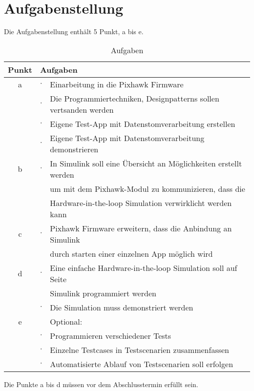 \section{Aufgabenstellung}

Die Aufgabenstellung enthält 5 Punkt, a bis e. \\

\begin{table}[ht]
\begin{tabular}{c | cl}
\hline

Punkt & \multicolumn{2}{l}{ Aufgaben}\\
\hline

a & $\cdot$ & Einarbeitung in die Pixhawk Firmware\\
  & $\cdot$ & Die Programmiertechniken, Designpatterns sollen vertsanden werden\\
  & $\cdot$ & Eigene Test-App mit Datenstomverarbeitung erstellen\\
  & $\cdot$ & Eigene Test-App mit Datenstomverarbeitung demonstrieren\\
\hline

b & $\cdot$ & In Simulink soll eine Übersicht an Möglichkeiten erstellt werden \\
  & & um mit dem Pixhawk-Modul zu kommunizieren, dass die \\
  & & Hardware-in-the-loop Simulation verwirklicht werden kann\\
\hline

c & $\cdot$ & Pixhawk Firmware erweitern, dass die Anbindung an Simulink \\
  & & durch starten einer einzelnen App möglich wird\\
\hline

d & $\cdot$ & Eine einfache Hardware-in-the-loop Simulation soll auf Seite \\
  & & Simulink programmiert werden\\
  & $\cdot$ & Die Simulation muss demonstriert werden\\
\hline

e & & Optional:\\
  & $\cdot$ & Programmieren verschiedener Tests\\
  & $\cdot$ & Einzelne Testcases in Testscenarien zusammenfassen\\
  & $\cdot$ & Automatisierte Ablauf von Testscenarien soll erfolgen\\
\hline
\end{tabular}

\label{tab:aufgaben}
\caption{Aufgaben}
\end{table}


\medskip

\noindent Die Punkte a bis d müssen vor dem Abschlusstermin erfüllt sein.\\


\clearpage